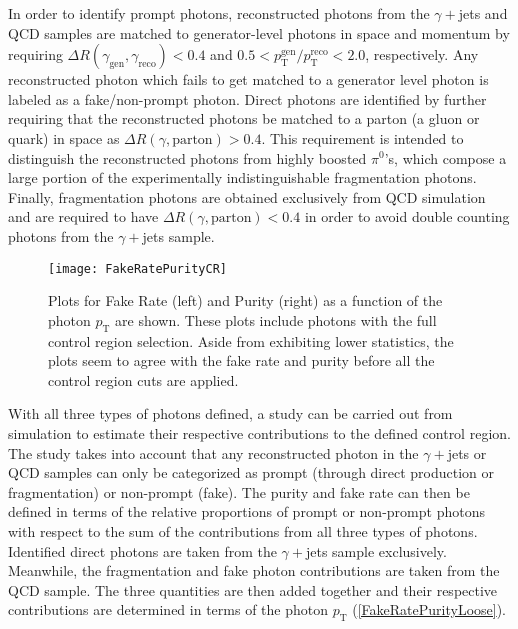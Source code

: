 \vspace{1em}

In order to identify prompt photons, reconstructed photons from the $\gamma+$jets and QCD samples are matched to generator-level photons in space and momentum by requiring $\Delta R(\gamma_\text{gen},\gamma_\text{reco}) < 0.4$ and $0.5 < p_\text{T}^\text{gen}/p_\text{T}^\text{reco} < 2.0$, respectively. Any reconstructed photon which fails to get matched to a generator level photon is labeled as a fake/non-prompt photon. Direct photons are identified by further requiring that the reconstructed photons be matched to a parton (a gluon or quark) in space as $\Delta R(\gamma,\text{parton}) > 0.4$. This requirement is intended to distinguish the reconstructed photons from highly boosted $\pi^0$'s, which compose a large portion of the experimentally indistinguishable fragmentation photons. Finally, fragmentation photons are obtained exclusively from QCD simulation and are required to have $\Delta R(\gamma,\text{parton}) < 0.4$ in order to avoid double counting photons from the $\gamma+$jets sample.

\begin{figure}[H]
\begin{center}
\texttt{[image: FakeRatePurityCR]}
\end{center}
\vspace{-1em}
\caption{Plots for Fake Rate (left) and Purity (right) as a function of the photon $p_\text{T}$ are shown. These plots include photons with the full control region selection. Aside from exhibiting lower statistics, the plots seem to agree with the fake rate and purity before all the control region cuts are applied.}
\label{FakeRatePurityCR}
\end{figure}

\vspace{1em}

With all three types of photons defined, a study can be carried out from simulation to estimate their respective contributions to the defined control region. The study takes into account that any reconstructed photon in the $\gamma+$jets or QCD samples can only be categorized as prompt (through direct production or fragmentation) or non-prompt (fake). The purity and fake rate can then be defined in terms of the relative proportions of prompt or non-prompt photons with respect to the sum of the contributions from all three types of photons. Identified direct photons are taken from the $\gamma+$jets sample exclusively. Meanwhile, the fragmentation and fake photon contributions are taken from the QCD sample. The three quantities are then added together and their respective contributions are determined in terms of the photon $p_\text{T}$ (\autoref{FakeRatePurityLoose}).

